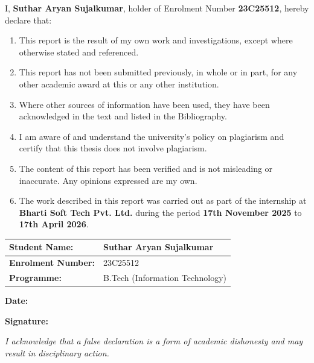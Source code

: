 \documentclass[
  12pt,
  a4paperpaper,
]{report}
\begin{document}
I, \textbf{Suthar Aryan Sujalkumar}, holder of Enrolment Number
\textbf{23C25512}, hereby declare that:

\begin{enumerate}
\def\labelenumi{\arabic{enumi}.}
\item
  This report is the result of my own work and investigations, except
  where otherwise stated and referenced.
\item
  This report has not been submitted previously, in whole or in part,
  for any other academic award at this or any other institution.
\item
  Where other sources of information have been used, they have been
  acknowledged in the text and listed in the Bibliography.
\item
  I am aware of and understand the university's policy on plagiarism and
  certify that this thesis does not involve plagiarism.
\item
  The content of this report has been verified and is not misleading or
  inaccurate. Any opinions expressed are my own.
\item
  The work described in this report was carried out as part of the
  internship at \textbf{Bharti Soft Tech Pvt. Ltd.} during the period
  \textbf{17th November 2025} to \textbf{17th April 2026}.
\end{enumerate}


\noindent\begin{tabularx}{\textwidth}{|p{5cm}|X|}
\hline
\textbf{Student Name:}     & Suthar Aryan Sujalkumar \\[3pt]
\hline
\textbf{Enrolment Number:} & 23C25512 \\[3pt]
\hline
\textbf{Programme:}        & B.Tech (Information Technology) \\
\hline
\end{tabularx}

\vspace{0.25in}

\noindent

\begin{minipage}[t]{0.50\textwidth}
\textbf{Date:} \underline{\hspace{1.8in}}
\end{minipage}\hfill
\begin{minipage}[t]{0.45\textwidth}
\textbf{Signature:} \underline{\hspace{1.8in}}
\end{minipage}


\emph{I acknowledge that a false declaration is a form of academic
dishonesty and may result in disciplinary action.}
\end{document}
